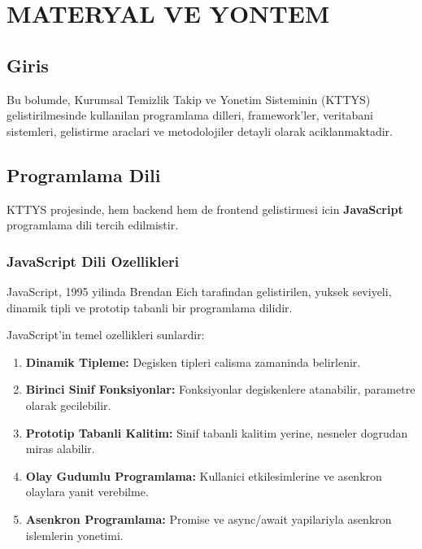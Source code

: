 
\chapter{MATERYAL VE YONTEM}
\label{chap:materyal-yontem}

\section{Giris}
\label{sec:materyal-giris}

Bu bolumde, Kurumsal Temizlik Takip ve Yonetim Sisteminin (KTTYS) 
gelistirilmesinde kullanilan programlama dilleri, framework'ler, 
veritabani sistemleri, gelistirme araclari ve metodolojiler detayli 
olarak aciklanmaktadir.

\section{Programlama Dili}
\label{sec:programlama-dili}

KTTYS projesinde, hem backend hem de frontend gelistirmesi icin 
\textbf{JavaScript} programlama dili tercih edilmistir.

\subsection{JavaScript Dili Ozellikleri}
\label{subsec:javascript-ozellikleri}

JavaScript, 1995 yilinda Brendan Eich tarafindan gelistirilen, 
yuksek seviyeli, dinamik tipli ve prototip tabanli bir programlama 
dilidir.

JavaScript'in temel ozellikleri sunlardir:

\begin{enumerate}
    \item \textbf{Dinamik Tipleme:} Degisken tipleri calisma 
    zamaninda belirlenir.
    \item \textbf{Birinci Sinif Fonksiyonlar:} Fonksiyonlar 
    degiskenlere atanabilir, parametre olarak gecilebilir.
    \item \textbf{Prototip Tabanli Kalitim:} Sinif tabanli 
    kalitim yerine, nesneler dogrudan miras alabilir.
    \item \textbf{Olay Gudumlu Programlama:} Kullanici 
    etkilesimlerine ve asenkron olaylara yanit verebilme.
    \item \textbf{Asenkron Programlama:} Promise ve async/await 
    yapilariyla asenkron islemlerin yonetimi.
\end{enumerate}

